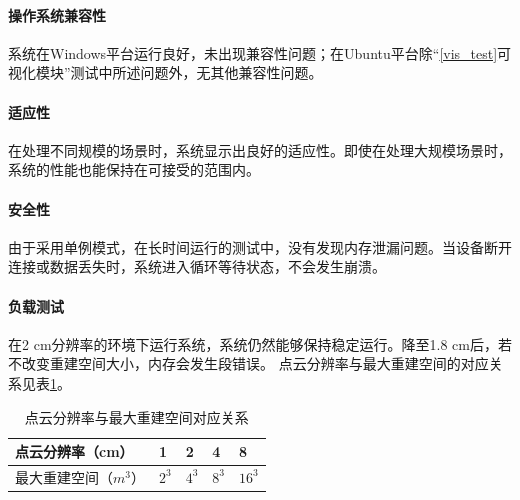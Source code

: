 \paragraph{操作系统兼容性}
\par 系统在Windows平台运行良好，未出现兼容性问题；在Ubuntu平台除“\ref{vis_test}可视化模块”测试中所述问题外，无其他兼容性问题。

\paragraph{适应性}
\par 在处理不同规模的场景时，系统显示出良好的适应性。即使在处理大规模场景时，系统的性能也能保持在可接受的范围内。

\paragraph{安全性}
\par 由于采用单例模式，在长时间运行的测试中，没有发现内存泄漏问题。当设备断开连接或数据丢失时，系统进入循环等待状态，不会发生崩溃。

\paragraph{负载测试}
\par 在2 cm分辨率的环境下运行系统，系统仍然能够保持稳定运行。降至1.8 cm后，若不改变重建空间大小，内存会发生段错误。
点云分辨率与最大重建空间的对应关系见表\ref{table:size_space_relation}。

\begin{table}[htbp]
	\centering
	\caption{点云分辨率与最大重建空间对应关系}
	\label{table:size_space_relation}
	\begin{tabular}{m{3.5cm}m{1cm}m{1cm}m{1cm}m{1cm}}
		\toprule
		点云分辨率（cm）     & 1     & 2     & 4     & 8      \\
		\midrule
		最大重建空间（$m^3$） & $2^3$ & $4^3$ & $8^3$ & $16^3$ \\
		\bottomrule
	\end{tabular}
\end{table}